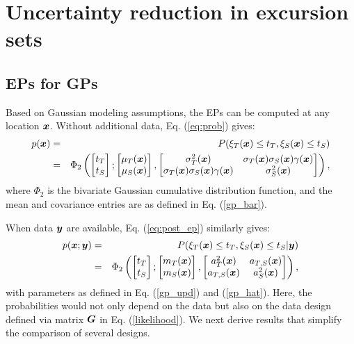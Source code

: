 \documentclass[aoas]{imsart}
\begin{document}
\section{Uncertainty reduction in excursion sets}
\label{sec:sur}

\subsection{EPs for GPs}

Based on Gaussian modeling assumptions, the EPs can be computed at any
location ${\boldsymbol x}$. Without additional data, Eq.  (\ref{eq:prob}) gives:
\begin{eqnarray}\label{eq:prob_mv0}
 p(\bx) &=& P(\xi_T(\bx) \leq t_T, \xi_S(\bx) \leq t_S) \nonumber \\
 &=& \Phi_2 \begin{pmatrix} 
\begin{bmatrix} t_T\\
t_S
\end{bmatrix};
\begin{bmatrix} \mu_{T}(\bx)\\
\mu_{S}(\bx)
\end{bmatrix},\begin{bmatrix}
\sigma_{T}^2(\bx) & \sigma_{T}(\bx)\sigma_{S}(\bx) \gamma(\bx)  \\
\sigma_{T}(\bx)\sigma_{S}(\bx) \gamma(\bx)  & \sigma_{S}^2(\bx)  
\end{bmatrix}\end{pmatrix},
\end{eqnarray}
where $\Phi_2$ is the bivariate Gaussian cumulative distribution
function, and the mean and covariance entries are as defined in
Eq. (\ref{gp_bar}).

When data ${\boldsymbol y}$ are available, Eq. (\ref{eq:post_ep}) similarly gives:
\begin{eqnarray}\label{eq:prob_mv}
 p(\bx;\by) &=& P(\xi_T(\bx) \leq t_T, \xi_S(\bx) \leq t_S |\by)
 \nonumber \\
 &=& \Phi_2 \begin{pmatrix} 
\begin{bmatrix} t_T\\
t_S
\end{bmatrix};
\begin{bmatrix} m_{T}(\bx)\\
m_{S}(\bx)
\end{bmatrix},\begin{bmatrix}
a_{T}^2(\bx) & a_{T,S}(\bx)  \\
a_{T,S}(\bx)  & a_{S}^2(\bx)  
\end{bmatrix}\end{pmatrix},
\end{eqnarray}
with parameters as defined in Eq. (\ref{gp_upd}) and
(\ref{gp_hat}). Here, the probabilities would not only depend on the
data but also on the data design defined via matrix ${\boldsymbol G}$ in
Eq. (\ref{likelihood}). We next derive results that simplify the
comparison of several designs.
\end{document}
